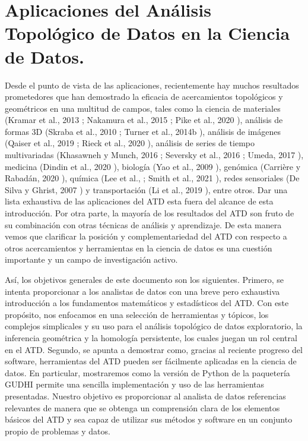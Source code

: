 \section*{Aplicaciones del An\'alisis Topol\'ogico de Datos en la Ciencia de Datos.}

Desde el punto de vista de las aplicaciones, recientemente hay muchos resultados prometedores que han
demostrado la eficacia de acercamientos topol\'ogicos y geom\'etricos en una multitud de campos, tales
como la ciencia de materiales (Kramar et al., 2013 \cite{Kramar2013}; Nakamura
et al., 2015 \cite{Nakamura2015}; Pike et al., 2020 \cite{Pike2020}), an\'alisis de
formas 3D (Skraba et al., 2010 \cite{Skraba2010}; Turner et al., 2014b \cite{Turner2014b}), an\'alisis
de im\'agenes (Qaiser et al., 2019 \cite{Qaiser2019}; Rieck et al., 2020 \cite{Rieck2020}), an\'alisis
de series de tiempo multivariadas (Khasawneh y Munch, 2016 \cite{Khasawneh2016};
Seversky et al., 2016 \cite{Seversky2016}; Umeda, 2017 \cite{Umeda2017}),
medicina (Dindin et al., 2020 \cite{Dindin2020}), biolog\'ia (Yao et al., 2009 \cite{Yao2009}),
gen\'omica (Carri\`ere y Rabad\'an, 2020 \cite{Carriere2020}), qu\'imica (Lee et al.,
\cite{Lee2017}; Smith et al., 2021 \cite{Smith2021}), redes sensoriales (De Silva y Ghrist, 2007
\cite{Silva2007}) y transportaci\'on (Li et al., 2019 \cite{Li2019}), entre otros. Dar una lista
exhaustiva de las aplicaciones del ATD esta fuera del alcance de esta introducci\'on. Por otra parte,
la mayor\'ia de los resultados del ATD son fruto de su combinaci\'on con otras t\'ecnicas de an\'alisis
y aprendizaje. De esta manera vemos que clarificar la posici\'on y complementariedad del ATD con respecto
a otros acercamientos y herramientas en la ciencia de datos es una cuesti\'on importante y un campo de
investigaci\'on activo.

As\'i, los objetivos generales de este documento son los siguientes. Primero, se intenta proporcionar
a los analistas de datos con una breve pero exhaustiva introducci\'on a los fundamentos matem\'aticos
y estad\'isticos del ATD. Con este prop\'osito, nos enfocamos en una selecci\'on de herramientas
y t\'opicos, los complejos simplicales y su uso para el an\'alisis topol\'ogico de datos exploratorio,
la inferencia geom\'etrica  y la homolog\'ia persistente, los cuales juegan un rol central en el ATD.
Segundo, se apunta a demostrar como, gracias al reciente progreso del software, herramientas del ATD
pueden ser f\'acilmente aplicadas en la ciencia de datos. En particular, mostraremos como la versi\'on
de Python de la paqueter\'ia GUDHI permite una sencilla implementaci\'on y uso de las herramientas
presentadas. Nuestro objetivo es proporcionar al analista de datos referencias relevantes de manera que
se obtenga un comprensi\'on clara de los elementos b\'asicos del ATD y sea capaz de utilizar sus
m\'etodos y software en un conjunto propio de problemas y datos.

